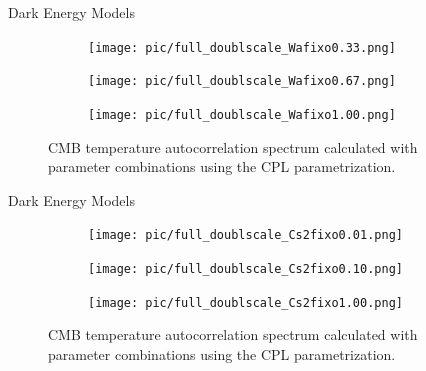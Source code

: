 \documentclass[serif, aspectratio=169]{beamer}
\begin{document}
\begin{frame}{Dark Energy Models}%

    \begin{figure}
        \centering
        \begin{subfigure}[b]{0.32\linewidth}
            \texttt{[image: pic/full\_doublscale\_Wafixo0.33.png]}
            \label{fig:DE_wa033}
        \end{subfigure}
        \hfill
        \begin{subfigure}[b]{0.32\linewidth}
            \texttt{[image: pic/full\_doublscale\_Wafixo0.67.png]}
            \label{fig:DE_wa067}
        \end{subfigure}
        \hfill
        \begin{subfigure}[b]{0.32\linewidth}
            \texttt{[image: pic/full\_doublscale\_Wafixo1.00.png]}
            \label{fig:DE_wa1}
        \end{subfigure}
    \caption{CMB temperature autocorrelation spectrum calculated with parameter combinations using the CPL parametrization.}
    \label{fig:DE_wa_fixo}
    \end{figure}

\end{frame}

\begin{frame}{Dark Energy Models}%

    \begin{figure}
        \centering
        \begin{subfigure}[b]{0.32\linewidth}
            \texttt{[image: pic/full\_doublscale\_Cs2fixo0.01.png]}
            \label{fig:DE_cs001}
        \end{subfigure}
        \hfill
        \begin{subfigure}[b]{0.32\linewidth}
            \texttt{[image: pic/full\_doublscale\_Cs2fixo0.10.png]}
            \label{fig:DE_cs01}
        \end{subfigure}
        \hfill
        \begin{subfigure}[b]{0.32\linewidth}
            \texttt{[image: pic/full\_doublscale\_Cs2fixo1.00.png]}
            \label{fig:DE_cs1}
        \end{subfigure}
    \caption{CMB temperature autocorrelation spectrum calculated with parameter combinations using the CPL parametrization.}
    \label{fig:DE_cs_fixo}
    \end{figure}

\end{frame}
\fi
\end{document}
